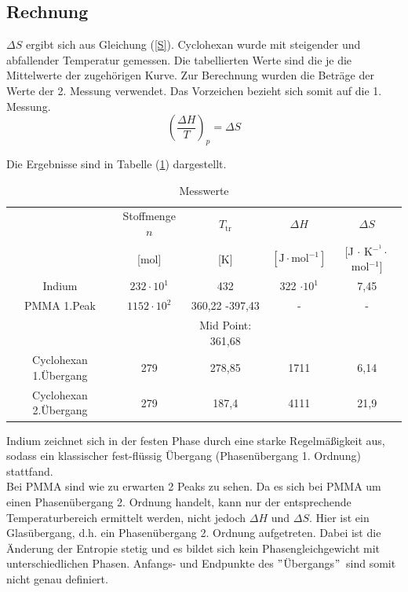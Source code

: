\documentclass[12pt,a4paper,titlepage,headinclude,bibtotoc]{scrartcl}
\begin{document}
\subsection{Rechnung}
 
$\Delta S$ ergibt sich aus Gleichung (\ref{S}). Cyclohexan wurde mit steigender und abfallender Temperatur gemessen. Die tabellierten Werte sind die je die Mittelwerte der zugehörigen Kurve. Zur Berechnung wurden die Beträge der Werte der 2. Messung verwendet. Das Vorzeichen bezieht sich somit auf die 1. Messung.\\

\begin{equation}\label{S}
\left(\frac{\Delta H}{T}\right)_p = \Delta S
\end{equation}

Die Ergebnisse sind in Tabelle (\ref{TabelleMesswerte}) dargestellt.\\

\begin{table} [h!] \label{TabelleMesswerte} %
\caption{Messwerte}
\begin{tabular}{c|c|c|c|c}
 & Stoffmenge $n$  & $T_\mathrm{tr}$  &  $\Delta H $ & $\Delta S$ \\ 
& [mol] & [K] & $[\mathrm{J} \cdot \mathrm{mol}^{-1}]$& [J $\cdot$ K$^{-^1}\cdot$mol$^{-1}$] \\
\hline 
Indium & $232 \cdot 10^1$ & 432 &  322 $\cdot 10^1$ & 7,45 \\ 
\hline 
PMMA 1.Peak & $1152 \cdot 10^2$ & 360,22 -397,43 &  - & - \\
&&Mid Point: 361,68&&\\ 
\hline 
Cyclohexan 1.Übergang & 279 & 278,85 & 1711 & 6,14 \\ 
Cyclohexan 2.Übergang & 279 & 187,4& 4111 & 21,9 \\
\end{tabular}
\end{table}
\FloatBarrier

Indium zeichnet sich in der festen Phase durch eine starke Regelmäßigkeit aus, sodass ein klassischer fest-flüssig Übergang (Phasenübergang 1. Ordnung) stattfand.\\
 
 Bei PMMA sind wie zu erwarten 2 Peaks zu sehen. Da es sich bei PMMA um einen Phasenübergang 2. Ordnung handelt, kann nur der entsprechende Temperaturbereich ermittelt werden, nicht jedoch $\Delta H$ und $\Delta S$. Hier ist ein Glasübergang, d.h. ein Phasenübergang 2. Ordnung aufgetreten. Dabei ist die Änderung der Entropie stetig und es bildet sich kein Phasengleichgewicht mit unterschiedlichen Phasen. Anfangs- und Endpunkte des $"$Übergangs$"$\, sind somit nicht genau definiert.\\
  
\end{document}
